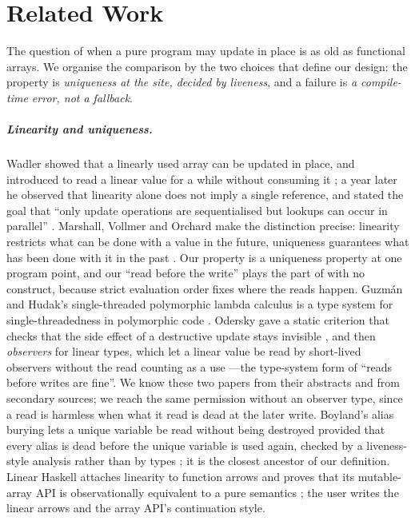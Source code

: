 \chapter{Related Work}
\label{sec:related}

The question of when a pure program may update in place is as old as functional arrays. We organise the
comparison by the two choices that define our design: the property is \emph{uniqueness at the site,
decided by liveness}, and a failure is \emph{a compile-time error, not a fallback}.

\paragraph{Linearity and uniqueness.} Wadler showed that a linearly used array can be updated in place,
and introduced  to read a linear value for a while without consuming it
\citep{wadler1990linear}; a year later he observed that linearity alone does not imply a single
reference, and stated the goal that ``only update operations are sequentialised but lookups can occur in
parallel'' \citep{wadler1991use}. Marshall, Vollmer and Orchard make the distinction precise: linearity
restricts what can be done with a value in the future, uniqueness guarantees what has been done with it
in the past \citep{marshall2022entente}. Our property is a uniqueness property at one program point,
and our ``read before the write'' plays the part of  with no construct, because strict
evaluation order fixes where the reads happen. Guzm\'an and Hudak's single-threaded polymorphic
lambda calculus is a type system for single-threadedness in polymorphic code \citep{guzman1990single}. Odersky gave a static criterion that
checks that the side effect of a destructive update stays invisible \citep{odersky1991destructive}, and
then \emph{observers} for linear types, which let a linear value be read by short-lived observers without
the read counting as a use \citep{odersky1992observers}---the type-system form of ``reads before writes are
fine''. We know these two papers from their abstracts and from secondary sources; we reach the same
permission without an observer type, since a read is harmless when what it read is dead at the later
write. Boyland's alias burying lets a unique variable be
read without being destroyed provided that every alias is dead before the unique variable is used again,
checked by a liveness-style analysis rather than by types \citep{boyland2001alias}; it is the closest
ancestor of our definition. Linear Haskell attaches linearity to function arrows and proves that its
mutable-array API is observationally equivalent to a pure semantics \citep{bernardy2018linear}; the user
writes the linear arrows and the array API's continuation style.

